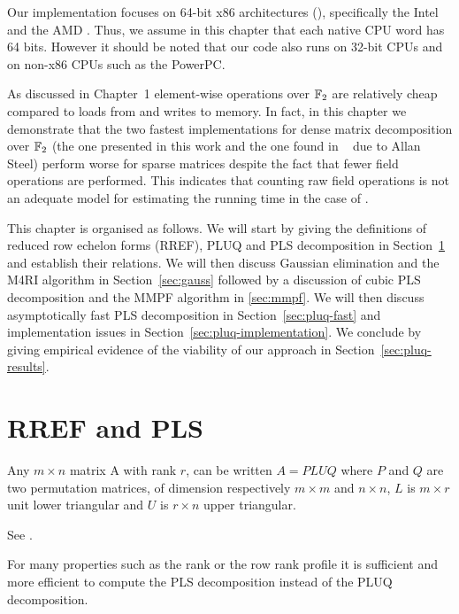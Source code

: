 Our implementation focuses on 64-bit x86 architectures (\xBG), specifically the Intel \CT and the AMD \Opteron. Thus, we assume in this chapter that each native CPU word has 64 bits. However it should be noted that our code also runs on 32-bit CPUs and on non-x86 CPUs such as the PowerPC.

As discussed in Chapter~1 element-wise operations over $\mathbb{F}_2$ are relatively cheap compared to loads from and writes to memory. In fact, in this chapter we demonstrate that the two fastest implementations for dense matrix decomposition over $\mathbb{F}_2$ (the one presented in this work and the one found in \Magma~\cite{magma} due to Allan Steel) perform worse for sparse matrices despite the fact that fewer field operations are performed. This indicates that counting raw field operations is not an adequate model for estimating the running time in the case of \GFZ.

This chapter is organised as follows. We will start by giving the definitions of reduced row echelon forms (RREF), PLUQ and PLS decomposition in Section~\ref{sec:pluq} and establish their relations. We will then discuss Gaussian elimination and the M4RI algorithm in Section~\ref{sec:gauss} followed by a discussion of cubic PLS decomposition and the MMPF algorithm in \ref{sec:mmpf}. We will then discuss asymptotically fast PLS decomposition in Section~\ref{sec:pluq-fast} and implementation issues in Section~\ref{sec:pluq-implementation}. We conclude by giving empirical evidence of the viability of our approach in Section~\ref{sec:pluq-results}.

\section{RREF and PLS}
\label{sec:pluq}

\begin{proposition} 
Any $m \times n$ matrix A with rank $r$, can be written $A = P LU Q$ where $P$ and $Q$ are two permutation matrices, of dimension respectively $m \times m$ and $n \times n$, $L$ is $m \times r$ unit lower triangular and $U$ is $r \times n$ upper triangular.
\end{proposition}

\noindent
\begin{citeproof}
See \cite{jeannerod-pernet-storjohann:pluq2010}.
\end{citeproof}

For many properties such as the rank or the row rank profile it is sufficient and more efficient to compute the PLS decomposition instead of the PLUQ decomposition.

